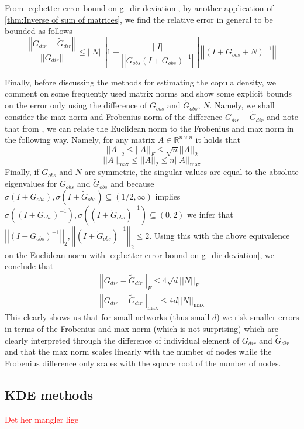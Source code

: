 \documentclass[../Thesis.tex]{subfiles}
\begin{document}
From \autoref{eq:better error bound on g_dir deviation}, by another application of \autoref{thm:Inverse of sum of matrices}, we find the relative error in general to be bounded as follows
$$\frac{\left|\left|G_{dir} - \tilde{G}_{dir}\right|\right|}{\left|\left|G_{dir}\right|\right|} \leq \left|\left| N \right|\right| \, \left|1 - \frac{\left|\left| I \right|\right|}{\left|\left| G_{obs} \left(I +G_{obs}\right)^{-1} \right|\right|} \right|\, \left|\left| \left(I + G_{obs} + N\right)^{-1} \right|\right|$$

Finally, before discussing the methods for estimating the copula density, we comment on some frequently used matrix norms and show some explicit bounds on the error only using the difference of $G_{obs}$ and $\tilde{G}_{obs}$, $N$. Namely, we shall consider the max norm and Frobenius norm of the difference $G_{dir} - \tilde{G}_{dir}$ and note that from \cite{GoluVanl96}, we can relate the Euclidean norm to the Frobenius and max norm in the following way. Namely, for any matrix $A\in \mathbb{R}^{n\times n}$ it holds that
$$\left|\left| A \right|\right|_2 \leq \left|\left| A \right|\right|_F \leq \sqrt{n} \left|\left| A \right|\right|_2$$
$$\left|\left| A \right|\right|_{\max} \leq \left|\left| A \right|\right|_2 \leq n \left|\left| A \right|\right|_{\max} $$
Finally, if $G_{obs}$ and $N$ are symmetric, the singular values are equal to the absolute eigenvalues for $G_{obs}$ and $\tilde{G}_{obs}$ and because $\sigma\left(I + G_{obs}\right), \sigma\left(I + \tilde{G}_{obs}\right) \subseteq (1/2, \infty)$ implies $\sigma\left(\left(I + G_{obs}\right)^{-1}\right), \sigma\left(\left( I +\tilde{ G}_{obs}\right)^{-1}\right) \subseteq (0,2)$ we infer that $\left|\left| \left(I + G_{obs}\right)^{-1} \right|\right|_2 , \left|\left| \left(I + \tilde{G}_{obs}\right)^{-1} \right|\right|_2\leq 2$. Using this with the above equivalence on the Euclidean norm with \autoref{eq:better error bound on g_dir deviation}, we conclude that
\begin{equation}\label{eq:G_dir difference frob and max bounds}
    \begin{split}
        \left|\left| G_{dir} - \tilde{G}_{dir} \right|\right|_F \leq 4 \sqrt{d} \left|\left| N \right|\right|_F\\
        \left|\left| G_{dir} - \tilde{G}_{dir} \right|\right|_{\max} \leq 4 d \left|\left| N \right|\right|_{\max}
    \end{split}
\end{equation}
This clearly shows us that for small networks (thus small $d$) we risk smaller errors in terms of the Frobenius and max norm (which is not surprising) which are clearly interpreted through the difference of individual element of $G_{dir}$ and $\tilde{G}_{dir}$ and that the max norm scales linearly with the number of nodes while the Frobenius difference only scales with the square root of the number of nodes.

\subsection{KDE methods}\label{subsec:Mutual information estimation and KDE methods}
\textcolor{red}{Det her mangler lige}
\end{document}
